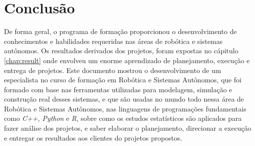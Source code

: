 \chapter{Conclusão}
\label{chap:conc}

De forma geral, o programa de formação proporcionou o desenvolvimento de conhecimentos e habilidades requeridas nas áreas de robótica e sistemas autônomos. Os resultados derivados dos projetos, foram expostas no cápitulo \ref{chap:result} onde envolveu um enorme aprendizado de planejamento, execução e entrega de projetos.
Este documento mostrou o desenvolvimento de um especialista no curso de formação em Robótica e Sistemas Autônomos, que foi formado com base nas ferramentas utilizadas para modelagem, simulação e construção real desses sistemas, e que são usadas no mundo todo nessa área de Robótica e Sistemas Autônomos, nas linguagens de programações fundamentais como \textit{C++, Python} e \textit{R}, sobre como os estudos estatísticos são aplicados para fazer análise dos projetos, e saber elaborar o planejamento, direcionar a execução e entregar os resultados aos clientes do projetos propostos. 

